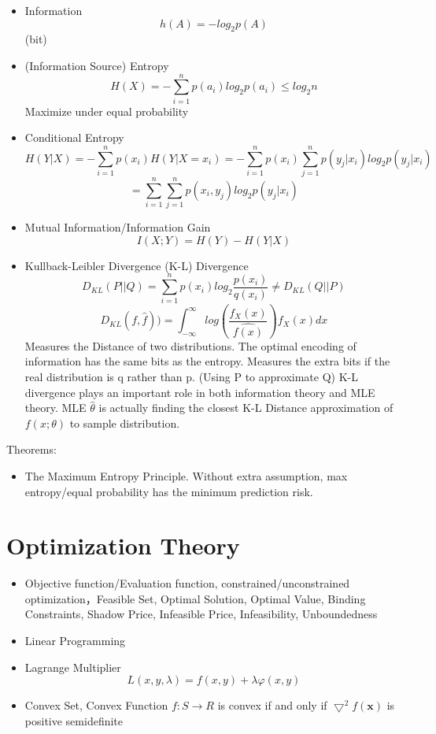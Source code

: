 \documentclass[11pt, openany]{book}              %
\begin{document}
\begin{itemize}
    \item Information $$h(A) = -log_2 p(A)$$ (bit)
    \item (Information Source) Entropy $$ H(X) = -\sum_{i=1}^n p(a_i)log_2p(a_i) \leq log_2 n$$ Maximize under equal probability
    \item Conditional Entropy $$H(Y|X)  = -\sum_{i=1}^n p(x_i)H(Y|X=x_i)= -\sum_{i=1}^n p(x_i)\sum_{j=1}^n p(y_j|x_i) log_2p(y_j|x_i) $$ $$ = \sum_{i=1}^n \sum_{j=1}^n p(x_i,y_j) log_2p(y_j|x_i) $$
    \item Mutual Information/Information Gain $$I(X;Y) = H(Y) - H(Y|X)$$
    \item Kullback-Leibler Divergence (K-L) Divergence 
      $$D_{KL}(P||Q) = \sum_{i=1}^n p(x_i) log_2\frac{p(x_i)}{q(x_i)} \neq D_{KL}(Q||P)$$
      $$D_{KL}(f,\hat{f})) = \int_{-\infty}^{\infty} log(\frac{f_X(x)}{\hat{f(x)}})f_X(x)dx $$
    Measures the Distance of two distributions. The optimal encoding of information has the same bits as the entropy. Measures the extra bits if the real distribution is q rather than p. (Using P to approximate Q) K-L divergence plays an important role in both information theory and MLE theory. MLE $\hat{\theta}$ is actually finding the closest K-L Distance approximation of $f(x;\theta)$ to sample distribution.
\end{itemize}


Theorems:

\begin{itemize}
    \item The Maximum Entropy Principle. Without extra assumption, max entropy/equal probability has the minimum prediction risk. 
\end{itemize}
 
\section{Optimization Theory}

\begin{itemize}
    \item Objective function/Evaluation function, constrained/unconstrained optimization，Feasible Set, Optimal Solution, Optimal Value, Binding Constraints, Shadow Price, Infeasible Price, Infeasibility, Unboundedness    
    \item Linear Programming
    \item Lagrange Multiplier $$L(x,y,\lambda) = f(x,y) + \lambda \varphi(x,y) $$
    \item Convex Set, Convex Function $f:S\to R$ is convex if and only if $\bigtriangledown^2 f(\mathbf{x})$ is positive semidefinite 
\end{itemize}
\end{document}
